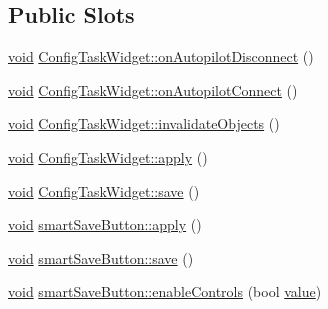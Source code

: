 \subsection*{Public Slots}
\begin{DoxyCompactItemize}
\item 
\hyperlink{group___u_a_v_objects_plugin_ga444cf2ff3f0ecbe028adce838d373f5c}{void} \hyperlink{group___u_a_v_object_widget_utils_ga306b82fa3b114ce5c336dfda60ae479d}{Config\-Task\-Widget\-::on\-Autopilot\-Disconnect} ()
\item 
\hyperlink{group___u_a_v_objects_plugin_ga444cf2ff3f0ecbe028adce838d373f5c}{void} \hyperlink{group___u_a_v_object_widget_utils_gaf5b2ddc9de02820e89c8133f5625607d}{Config\-Task\-Widget\-::on\-Autopilot\-Connect} ()
\item 
\hyperlink{group___u_a_v_objects_plugin_ga444cf2ff3f0ecbe028adce838d373f5c}{void} \hyperlink{group___u_a_v_object_widget_utils_ga1505f6e22cf2e4167b03fca9417f91a5}{Config\-Task\-Widget\-::invalidate\-Objects} ()
\item 
\hyperlink{group___u_a_v_objects_plugin_ga444cf2ff3f0ecbe028adce838d373f5c}{void} \hyperlink{group___u_a_v_object_widget_utils_ga139dc5f372c46b8ad1614d637e762018}{Config\-Task\-Widget\-::apply} ()
\item 
\hyperlink{group___u_a_v_objects_plugin_ga444cf2ff3f0ecbe028adce838d373f5c}{void} \hyperlink{group___u_a_v_object_widget_utils_gabae71bcf9c71f99595c365fd49b342fc}{Config\-Task\-Widget\-::save} ()
\item 
\hyperlink{group___u_a_v_objects_plugin_ga444cf2ff3f0ecbe028adce838d373f5c}{void} \hyperlink{group___u_a_v_object_widget_utils_ga453b1bbd8b56fa6af4f362b00221b265}{smart\-Save\-Button\-::apply} ()
\item 
\hyperlink{group___u_a_v_objects_plugin_ga444cf2ff3f0ecbe028adce838d373f5c}{void} \hyperlink{group___u_a_v_object_widget_utils_gad0e6541ace97075634254ba3b1cc9bf9}{smart\-Save\-Button\-::save} ()
\item 
\hyperlink{group___u_a_v_objects_plugin_ga444cf2ff3f0ecbe028adce838d373f5c}{void} \hyperlink{group___u_a_v_object_widget_utils_ga56d88dfdb1b735dbaf2c957e32fca452}{smart\-Save\-Button\-::enable\-Controls} (bool \hyperlink{glext_8h_aa0e2e9cea7f208d28acda0480144beb0}{value})
\end{DoxyCompactItemize}
